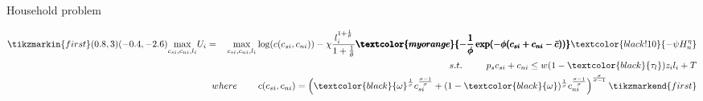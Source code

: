 \documentclass[11pt,aspectratio=169]{beamer}
\newcommand{\tr}[1]{\textcolor{blue}{#1}}
\begin{document}
	\addtocounter{framenumber}{-1}
	\begin{frame}{Household problem} %
		\hypertarget{backBN}{}
		\hypertarget{backengel}{}
		\hypertarget{wtp}{}
		\vspace{2mm}
		\begin{minipage}[t!]{1\textwidth}
			\begin{align*}
			\tikzmarkin{first}(0.8,3)(-0.4,-2.6)
			\underset{c_{si},c_{ni}, l_i}{\max} U_i=\ \hspace{2mm} \underset{c_{si},c_{ni}, l_i}{\max} \log(c(c_{si},c_{ni}))-\chi\frac{l_i^{1+\frac{1}{\theta}}}{1+\frac{1}{\theta}}  \pmb{\textcolor{myorange}{-\frac{1}{\phi}\exp(-\phi(c_{si}+c_{ni}-\bar{c}))}}\textcolor{black!10}{ -\psi H_n^\eta}\\ 
			s.t.\ \hspace{6mm}  \hspace{2mm }p_{s}c_{si}+c_{ni}\leq w(1-\textcolor{black}{\tau_l})z_il_i+T%
			\\\hspace{-10mm} where \hspace{8mm}c(c_{si},c_{ni}) =
			\left(\textcolor{black}{\omega}^{\frac{1}{\sigma}}c_{si}^{\frac{\sigma-1}{\sigma}}+(1-\textcolor{black}{\omega})^{\frac{1}{\sigma}}c_{ni}^{\frac{\sigma-1}{\sigma}}\right)^{\frac{\sigma}{\sigma-1}}%
			\tikzmarkend{first}
			\end{align*}
		\end{minipage}
		
		

\end{frame}
\end{document}
